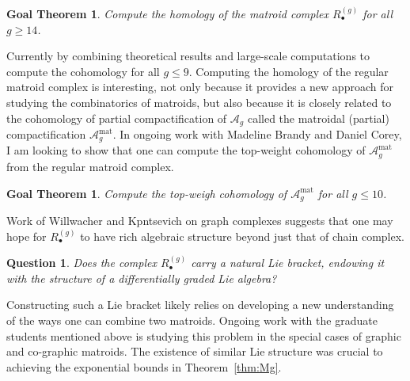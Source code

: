 \documentclass[11pt,reqno]{amsart}
\newtheorem{goalTheorem}[lemma]{Goal Theorem}
\newtheorem{question}[lemma]{Question}
\theoremstyle{remark}
\newcommand{\mat}{\operatorname{mat}}
\newcommand{\cA}{\mathcal{A}}
\begin{document}
\begin{goalTheorem}
Compute the homology of the matroid complex $R_{\bullet}^{(g)}$ for all $g\geq 14$.
\end{goalTheorem}

Currently by combining theoretical results and large-scale computations to compute the cohomology for all $g\leq 9$. Computing the homology of the regular matroid complex is interesting, not only because it provides a new approach for studying the combinatorics of matroids, but also because it is closely related to the cohomology of partial compactification of $\cA_{g}$ called the matroidal (partial) compactification $\cA_{g}^{\mat}$. In ongoing work with Madeline Brandy and Daniel Corey, I am looking to show that one can compute the top-weight cohomology of $\cA_{g}^{\mat}$ from the regular matroid complex. 

\begin{goalTheorem}
Compute the top-weigh cohomology of $\cA_{g}^{\mat}$ for all $g\leq 10$. 
\end{goalTheorem}

Work of Willwacher \cite{willwacher15} and Kpntsevich \cite{kontsevich93, kontsevich94} on graph complexes suggests that one may hope for $R_{\bullet}^{(g)}$ to have rich algebraic structure beyond just that of chain complex.

\begin{question}
Does the complex $R_{\bullet}^{(g)}$ carry a natural Lie bracket, endowing it with the structure of a differentially graded Lie algebra?
\end{question}

Constructing such a Lie bracket likely relies on developing a new understanding of the ways one can combine two matroids. Ongoing work with the graduate students mentioned above is studying this problem in the special cases of graphic and co-graphic matroids. The existence of similar Lie structure was crucial to achieving the exponential bounds in Theorem~\ref{thm:Mg}.
\end{document}
